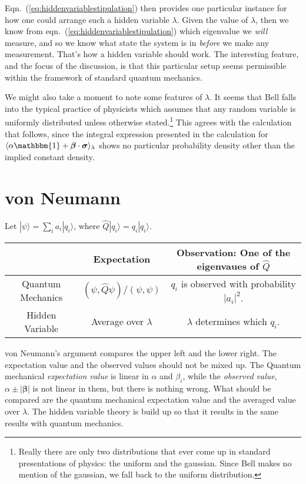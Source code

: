 \documentclass[12pt]{article}
\begin{document}
Eqn.~(\ref{eq:hiddenvariablestipulation}) then provides one particular instance for how one could arrange such a hidden variable $\lambda$. Given the value of $\lambda$, then we know from eqn.~(\ref{eq:hiddenvariablestipulation}) which eigenvalue we \emph{will} measure, and so we know what state the system is in \emph{before} we make any measurement. That's how a hidden variable should work. The interesting feature, and the focus of the discussion, is that this particular setup seems permissible within the framework of standard quantum mechanics.

We might also take a moment to note some features of $\lambda$. It seems that Bell falls into the typical practice of physicists which assumes that any random variable is uniformly distributed unless otherwise stated.\footnote{Really there are only two distributions that ever come up in standard presentations of physics: the uniform and the gaussian. Since Bell makes no mention of the gaussian, we fall back to the uniform distribution.} This agrees with the calculation that follows, since the integral expression presented in the calculation for $\langle \alpha \mathbbm{1} + \bm{\beta} \cdot \bm{\sigma} \rangle_{\lambda}$ shows no particular probability density other than the implied constant density.

\section{von Neumann}
Let $|\psi\rangle=\sum_{i}a_i|q_i\rangle$, where $\hat{Q}|q_i\rangle = q_i |q_i\rangle$.
\begin{center}
\begin{tabular}{c|cc}
\hline
 & Expectation & Observation: One of the eigenvaues of $\hat{Q}$ \\  \hline
Quantum Mechanics & $(\psi, \hat{Q}\psi)/(\psi, \psi)$ & $q_i$ is observed with probability $|a_i|^2$.\\
Hidden Variable & Average over $\lambda$ & $\lambda$ determines which $q_i$. \\ \hline
\end{tabular}
\end{center}
von Neumann's argument compares the upper left and the lower right. The expectation value and the observed values should not be mixed up. The Quantum mechanical {\it expectation value} is linear in $\alpha$ and $\beta_i$, while the {\it observed value}, $\alpha\pm|\bm{\beta}|$ is not linear in them, but there is nothing wrong. What should be compared are the quantum mechanical expectation value and the averaged value over $\lambda$. The hidden variable theory is build up so that it results in the same results with quantum mechanics.






\end{document}
